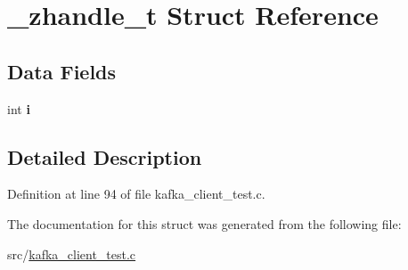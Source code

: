 \hypertarget{struct__zhandle__t}{\section{\-\_\-zhandle\-\_\-t \-Struct \-Reference}
\label{struct__zhandle__t}
}
\subsection*{\-Data \-Fields}
\begin{DoxyCompactItemize}
\item 
\hypertarget{struct__zhandle__t_af11f06d156a6cc2dad65e5e7b09dc91c}{int {\bfseries i}}\label{struct__zhandle__t_af11f06d156a6cc2dad65e5e7b09dc91c}

\end{DoxyCompactItemize}


\subsection{\-Detailed \-Description}


\-Definition at line 94 of file kafka\-\_\-client\-\_\-test.\-c.



\-The documentation for this struct was generated from the following file\-:\begin{DoxyCompactItemize}
\item 
src/\hyperlink{kafka__client__test_8c}{kafka\-\_\-client\-\_\-test.\-c}\end{DoxyCompactItemize}
